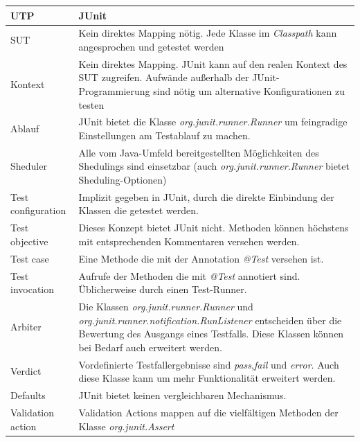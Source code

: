 \begin{table}[h]

\centering
\begin{tabular}
{ | l |p{9cm}|} \hline
\textbf{UTP} & \textbf{JUnit} \\ \hline
SUT                       & Kein direktes Mapping nötig. Jede Klasse im \textit{Classpath} kann angesprochen und getestet werden   \\ \hline
Kontext                   & Kein direktes Mapping. JUnit kann auf den realen Kontext des SUT zugreifen. Aufwände außerhalb der JUnit-Programmierung sind nötig um alternative Konfigurationen zu testen \\ \hline
Ablauf         			  & JUnit bietet die Klasse \textit{org.junit.runner.Runner} um feingradige Einstellungen am Testablauf zu machen. \\ \hline
Sheduler                  & Alle vom Java-Umfeld bereitgestellten Möglichkeiten des Shedulings sind einsetzbar (auch \textit{org.junit.runner.Runner} bietet Sheduling-Optionen) \\ \hline
Test configuration        & Implizit gegeben in JUnit, durch die direkte Einbindung der Klassen die getestet werden. \\ \hline
Test objective            & Dieses Konzept bietet JUnit nicht. Methoden können höchstens mit entsprechenden Kommentaren versehen werden.\\ \hline
Test case                 & Eine Methode die mit der Annotation \textit{@Test} versehen ist. \\ \hline
Test invocation           & Aufrufe der Methoden die mit \textit{@Test} annotiert sind. Üblicherweise durch einen Test-Runner. \\ \hline
Arbiter                   & Die Klassen \textit{org.junit.runner.Runner} und \textit{org.junit.runner.notification.RunListener} entscheiden über die Bewertung des Ausgangs eines Testfalls. Diese Klassen können bei Bedarf auch erweitert werden. \\ \hline
Verdict                   & Vordefinierte Testfallergebnisse sind \textit{pass},\textit{fail} und \textit{error}. Auch diese Klasse kann um mehr Funktionalität erweitert werden. \\ \hline
Defaults                  & JUnit bietet keinen vergleichbaren Mechanismus.  \\ \hline
Validation action         & Validation Actions mappen auf die vielfältigen Methoden der Klasse \textit{org.junit.Assert} \\ \hline

\end{tabular}
\end{table}
